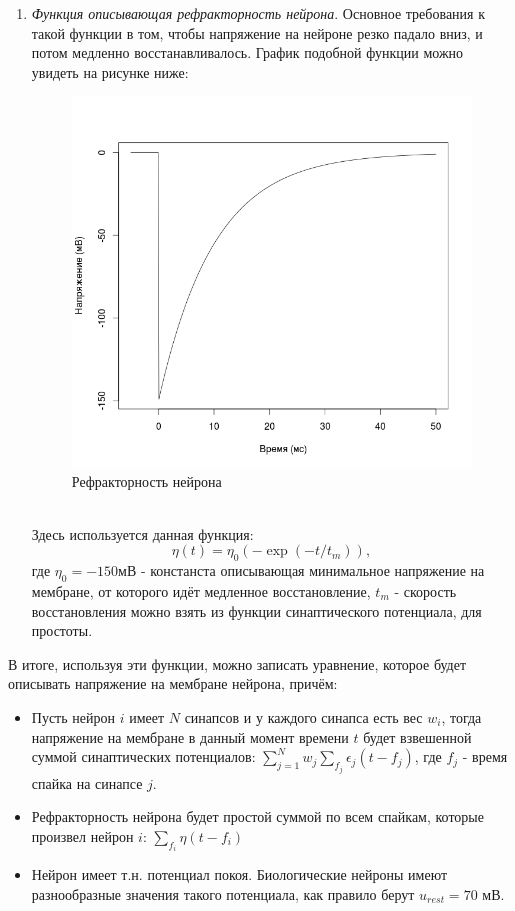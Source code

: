 \documentclass[a4paper,10pt]{article}
\begin{document}
\begin{enumerate}
\item \textit{Функция описывающая рефракторность нейрона}. Основное требования к такой функции в том, чтобы напряжение на нейроне резко падало вниз, и потом медленно восстанавливалось. График подобной функции можно увидеть на рисунке ниже:
\begin{figure}[ht]
\centering
\includegraphics[width=0.75\linewidth]{nu}
\caption{Рефракторность нейрона}
\end{figure} \\
Здесь используется данная функция:
\begin{equation}\label{eq:nu}
\eta(t) =	\eta_{0}(-\exp(-t/t_{m})),
\end{equation}
где $\eta_{0} = -150$мВ - констанста описывающая минимальное напряжение на мембране, от которого идёт медленное восстановление, $t_{m}$ - скорость восстановления можно взять из функции синаптического потенциала, для простоты. 
\end{enumerate}
В итоге, используя эти функции, можно записать уравнение, которое будет описывать напряжение на мембране нейрона, причём: \\
\begin{itemize}
 \item Пусть нейрон $i$ имеет $N$ синапсов и у каждого синапса есть вес $w_{i}$, тогда напряжение на мембране в данный момент времени $t$ будет взвешенной суммой синаптических потенциалов: $\sum_{j=1}^N w_{j} \sum_{f_{j}} \epsilon_{j}(t-f_{j})$, где $f_{j}$ - время спайка на синапсе $j$. \\
\item Рефракторность нейрона будет простой суммой по всем спайкам, которые произвел нейрон $i$: $\sum_{f_{i}}\eta(t-f_{i})$
\item Нейрон имеет т.н. потенциал покоя. Биологические нейроны имеют разнообразные значения такого потенциала, как правило берут $u_{rest} = 70$ мВ.
\end{itemize}
\end{document}
